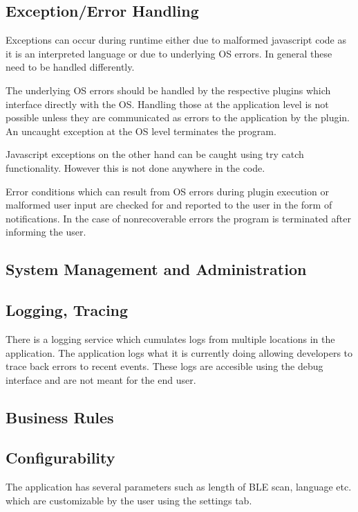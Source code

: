 \documentclass[]{article}
\begin{document}
\subsection{Exception/Error Handling}

Exceptions can occur during runtime either due to malformed javascript code as it is an interpreted language or due to underlying OS errors. In general these need to be handled differently.

The underlying OS errors should be handled by the respective plugins which interface directly with the OS. Handling those at the application level is not possible unless they are communicated as errors to the application by the plugin. An uncaught exception at the OS level terminates the program.

Javascript exceptions on the other hand can be caught using try catch functionality. However this is not done anywhere in the code.

Error conditions which can result from OS errors during plugin execution or malformed user input are checked for and reported to the user in the form of notifications. In the case of nonrecoverable errors the program is terminated after informing the user.

\subsection{System Management and Administration}

\subsection{Logging, Tracing}

There is a logging service which cumulates logs from multiple locations in the application. The application logs what it is currently doing allowing developers to trace back errors to recent events. These logs are accesible using the debug interface and are not meant for the end user. 

\subsection{Business Rules}

\subsection{Configurability}

The application has several parameters such as length of BLE scan, language etc. which are customizable by the user using the settings tab. 
\end{document}
